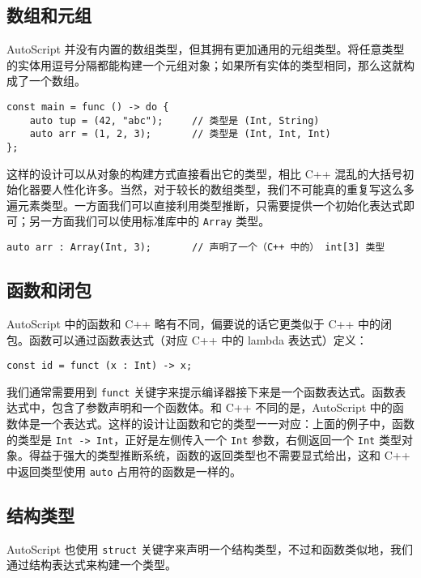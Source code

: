 \subsection{数组和元组}

AutoScript 并没有内置的数组类型，但其拥有更加通用的元组类型。将任意类型的实体用逗号分隔都能构建一个元组对象；如果所有实体的类型相同，那么这就构成了一个数组。

\begin{lstlisting}
const main = func () -> do {
	auto tup = (42, "abc");		// 类型是 (Int, String)
	auto arr = (1, 2, 3);		// 类型是 (Int, Int, Int)
};
\end{lstlisting}

这样的设计可以从对象的构建方式直接看出它的类型，相比 C++ 混乱的大括号初始化器要人性化许多。当然，对于较长的数组类型，我们不可能真的重复写这么多遍元素类型。一方面我们可以直接利用类型推断，只需要提供一个初始化表达式即可；另一方面我们可以使用标准库中的 \lstinline!Array! 类型。

\begin{lstlisting}
auto arr : Array(Int, 3);		// 声明了一个（C++ 中的） int[3] 类型
\end{lstlisting}


\subsection{函数和闭包}

AutoScript 中的函数和 C++ 略有不同，偏要说的话它更类似于 C++ 中的闭包。函数可以通过函数表达式（对应 C++ 中的 lambda 表达式）定义：

\begin{lstlisting}
const id = funct (x : Int) -> x;
\end{lstlisting}

我们通常需要用到 \lstinline!funct! 关键字来提示编译器接下来是一个函数表达式。函数表达式中，包含了参数声明和一个函数体。和 C++ 不同的是，AutoScript 中的函数体是一个表达式。这样的设计让函数和它的类型一一对应：上面的例子中，函数的类型是 \lstinline!Int -> Int!，正好是左侧传入一个 \lstinline!Int! 参数，右侧返回一个 \lstinline!Int! 类型对象。得益于强大的类型推断系统，函数的返回类型也不需要显式给出，这和 C++ 中返回类型使用 \lstinline!auto! 占用符的函数是一样的。


\subsection{结构类型}

AutoScript 也使用 \lstinline!struct! 关键字来声明一个结构类型，不过和函数类似地，我们通过结构表达式来构建一个类型。

